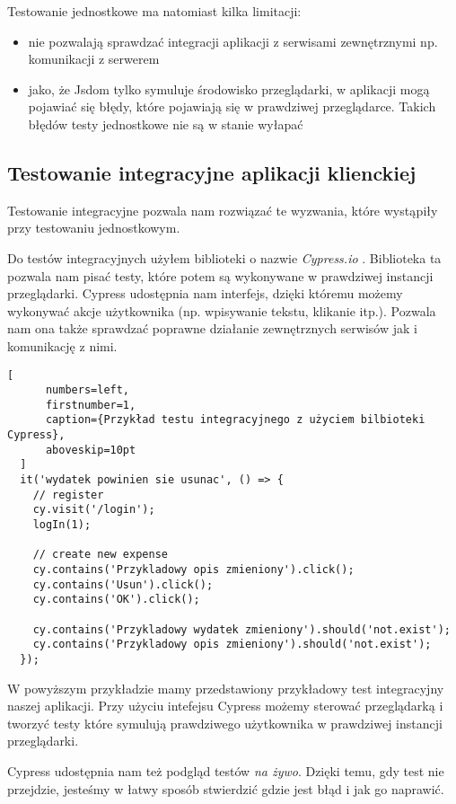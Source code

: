 Testowanie jednostkowe ma natomiast kilka limitacji:
\begin{itemize}
  \item nie pozwalają sprawdzać integracji aplikacji z serwisami zewnętrznymi np. komunikacji z serwerem
  \item jako, że Jsdom tylko symuluje środowisko przeglądarki, w aplikacji mogą pojawiać się błędy, które pojawiają się w prawdziwej przeglądarce. Takich błędów testy jednostkowe nie są w stanie wyłapać
\end{itemize}

\subsection{Testowanie integracyjne aplikacji klienckiej}
Testowanie integracyjne pozwala nam rozwiązać te wyzwania, które wystąpiły przy testowaniu jednostkowym. 

Do testów integracyjnych użyłem biblioteki o nazwie \emph{Cypress.io} \cite{ref_cypress_doc}. Biblioteka ta pozwala nam pisać testy, które potem są wykonywane w prawdziwej instancji przeglądarki. Cypress udostępnia nam interfejs, dzięki któremu możemy wykonywać akcje użytkownika (np. wpisywanie tekstu, klikanie itp.). Pozwala nam ona także sprawdzać poprawne działanie zewnętrznych serwisów jak i komunikację z nimi. 

  \begin{addmargin}[6mm]{0mm}
  \begin{lstlisting}[
      numbers=left,
      firstnumber=1,
      caption={Przykład testu integracyjnego z użyciem bilbioteki Cypress},
      aboveskip=10pt
  ]
  it('wydatek powinien sie usunac', () => {
    // register
    cy.visit('/login');
    logIn(1);

    // create new expense
    cy.contains('Przykladowy opis zmieniony').click();
    cy.contains('Usun').click();
    cy.contains('OK').click();

    cy.contains('Przykladowy wydatek zmieniony').should('not.exist');
    cy.contains('Przykladowy opis zmieniony').should('not.exist');
  });
  \end{lstlisting}
  \end{addmargin}
  W powyższym przykładzie mamy przedstawiony przykładowy test integracyjny naszej aplikacji. Przy użyciu intefejsu Cypress możemy sterować przeglądarką i tworzyć testy które symulują prawdziwego użytkownika w prawdziwej instancji przeglądarki.

Cypress udostępnia nam też podgląd testów \emph{na żywo}. Dzięki temu, gdy test nie przejdzie, jesteśmy w łatwy sposób stwierdzić gdzie jest błąd i jak go naprawić.

